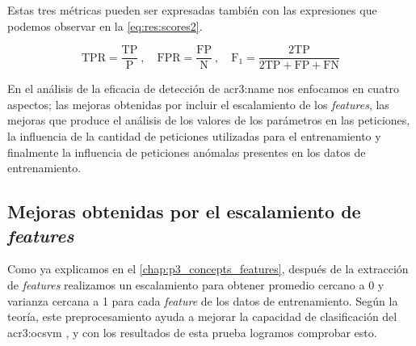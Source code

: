 Estas tres métricas pueden ser expresadas también con las expresiones
que podemos observar en la \autoref{eq:res:scores2}.

\begin{equation}
    \label{eq:res:scores2}
    \text{TPR} = \frac{\text{TP}}{\text{P}}
    \ , \quad
    \text{FPR} = \frac{\text{FP}}{\text{N}}
    \ , \quad
    \text{F}_{1} = \frac{2 \text{TP}}{2 \text{TP} + \text{FP} + \text{FN}}
\end{equation}

En el análisis de la eficacia de detección de \gls{acr3:name} nos enfocamos
en cuatro aspectos; las mejoras obtenidas por incluir el escalamiento de
los \textit{features}, las mejoras que produce el análisis de los valores
de los parámetros en las peticiones, la influencia de la cantidad de
peticiones utilizadas para el entrenamiento y finalmente la influencia
de peticiones anómalas presentes en los datos de entrenamiento.


\subsection{Mejoras obtenidas por el escalamiento de \textit{features}}

Como ya explicamos en el \autoref{chap:p3_concepts_features}, después
de la extracción de \textit{features} realizamos un escalamiento para
obtener promedio cercano a 0 y varianza cercana a 1 para cada \textit{feature}
de los datos de entrenamiento. Según la teoría, este preprocesamiento ayuda
a mejorar la capacidad de clasificación del \gls{acr3:ocsvm}
\citep{rieck2009machine}, %
y con los resultados de esta prueba logramos comprobar esto.

